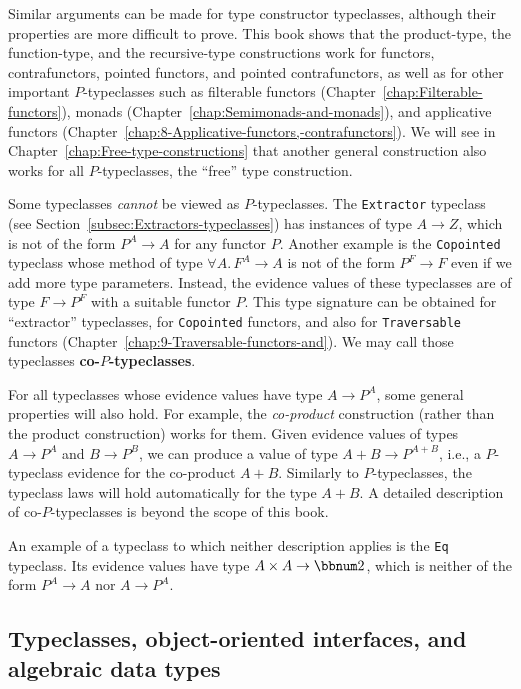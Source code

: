 Similar arguments can be made for type constructor typeclasses, although
their properties are more difficult to prove. This book shows that
the product-type, the function-type, and the recursive-type constructions
work for functors, contrafunctors, pointed functors, and pointed contrafunctors,
as well as for other important $P$-typeclasses such as filterable
functors (Chapter~\ref{chap:Filterable-functors}), monads (Chapter~\ref{chap:Semimonads-and-monads}),
and applicative functors (Chapter~\ref{chap:8-Applicative-functors,-contrafunctors}).
We will see in Chapter~\ref{chap:Free-type-constructions} that another
general construction also works for all $P$-typeclasses, \textemdash{}
the \textsf{``}free\textsf{''} type construction.

Some typeclasses \emph{cannot} be viewed as $P$-typeclasses. The
\lstinline!Extractor! typeclass (see Section~\ref{subsec:Extractors-typeclasses})
has instances of type $A\rightarrow Z$, which is not of the form
$P^{A}\rightarrow A$ for any functor $P$. Another example is the
\lstinline!Copointed! typeclass whose method of type $\forall A.\,F^{A}\rightarrow A$
is not of the form $P^{F}\rightarrow F$ even if we add more type
parameters. Instead, the evidence values of these typeclasses are
of type $F\rightarrow P^{F}$ with a suitable functor $P$. This type
signature can be obtained for \textsf{``}extractor\textsf{''} typeclasses, for \lstinline!Copointed!
functors, and also for \lstinline!Traversable! functors (Chapter~\ref{chap:9-Traversable-functors-and}).
We may call those typeclasses \textbf{co-}$P$\textbf{-typeclasses}.

For all typeclasses whose evidence values have type $A\rightarrow P^{A}$,
some general properties will also hold. For example, the \emph{co-product}
construction (rather than the product construction) works for them.
Given evidence values of types $A\rightarrow P^{A}$ and $B\rightarrow P^{B}$,
we can produce a value of type $A+B\rightarrow P^{A+B}$, i.e., a
$P$-typeclass evidence for the co-product $A+B$. Similarly to $P$-typeclasses,
the typeclass laws will hold automatically for the type $A+B$. A
detailed description of co-$P$-typeclasses is beyond the scope of
this book.

An example of a typeclass to which neither description applies is
the \lstinline!Eq! typeclass. Its evidence values have type $A\times A\rightarrow\bbnum 2$,
which is neither of the form $P^{A}\rightarrow A$ nor $A\rightarrow P^{A}$.

\subsection{Typeclasses, object-oriented interfaces, and algebraic data types}

